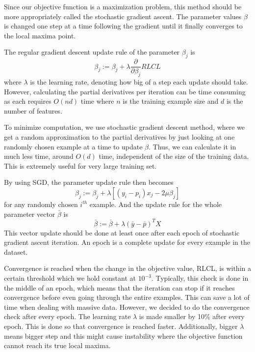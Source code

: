 \documentclass{article} %
\begin{document}
Since our objective function is a maximization problem, this method should be more appropriately called the stochastic gradient ascent. The parameter values $\beta$ is changed one step at a time following the gradient until it finally converges to the local maxima point.

The regular gradient descent update rule of the parameter $\beta_j$ is
\begin{equation} \label{eq:update_rule_regular}
\beta_j := \beta_j + \lambda \frac{\partial}{\partial \beta_j} RLCL
\end{equation}
where $\lambda$ is the learning rate, denoting how big of a step each update should take. However, calculating the partial derivatives per iteration can be time consuming as each requires $O(nd)$ time where $n$ is the training example size and $d$ is the number of features.

To minimize computation, we use stochastic gradient descent method, where we get a random approximation to the partial derivatives by just looking at one randomly chosen example at a time to update $\beta$. Thus, we can calculate it in much less time, around $O(d)$ time, independent of the size of the training data. This is extremely useful for very large training set.

By using SGD, the parameter update rule then becomes
\begin{equation} \label{eq:update_rule_stochastic_i}
\beta_j := \beta_j + \lambda [(y_i - p_i)x_j - 2 \mu \beta_j]
\end{equation}
for any randomly chosen $i^{th}$ example. And the update rule for the whole parameter vector $\bar{\beta}$ is
\begin{equation} \label{eq:update_rule_stochastic}
\bar{\beta} := \bar{\beta} + \lambda (\bar{y} - \bar{p})^{T}X
\end{equation}
This vector update should be done at least once after each epoch of stochastic gradient ascent iteration. An epoch is a complete update for every example in the dataset.

Convergence is reached when the change in the objective value, RLCL, is within a certain threshold which we hold constant at $10^{-3}$. Typically, this check is done in the middle of an epoch, which means that the iteration can stop if it reaches convergence before even going through the entire examples. This can save a lot of time when dealing with massive data. However, we decided to do the convergence check after every epoch. The learning rate $\lambda$ is made smaller by 10\% after every epoch. This is done so that convergence is reached faster. Additionally, bigger $\lambda$ means bigger step and this might cause instability where the objective function cannot reach its true local maxima.
\end{document}
